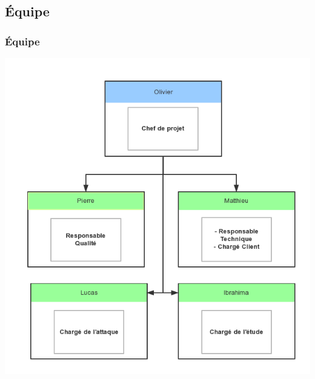 \subsection{Équipe}
\begin{frame}
    \frametitle{\color{white}Équipe}
  \begin{center}
    \includegraphics[scale=0.30]{guipgteam.png}
  \end{center}
\end{frame}
